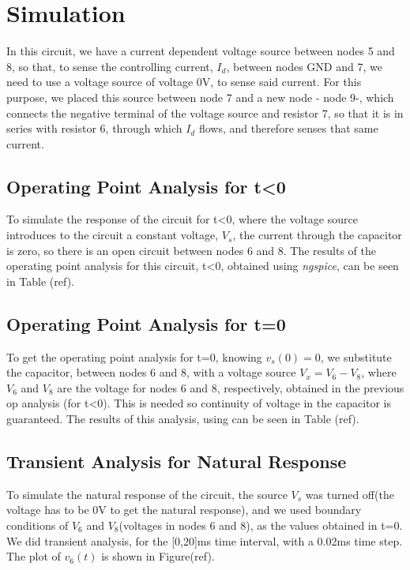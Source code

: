 \section{Simulation}
\label{sec:simulation}
In this circuit, we have a current dependent voltage source between nodes 5 and 8, so that, to sense the controlling current, $I_d$, between nodes GND and 7, we need to use a voltage source of voltage 0V, to sense said current. For this purpose, we placed this source between node 7 and a new node - node 9-, which connects the negative terminal of the voltage source and resistor 7, so that it is in series with resistor 6, through which $I_d$ flows, and therefore senses that same current.\\
\subsection{Operating Point Analysis for t\textless0}
To simulate the response of the circuit for t\textless0, where the voltage source introduces to the circuit a constant voltage, $V_s$, the current through the capacitor is zero, so there is an open circuit between nodes 6 and 8. The results of the operating point analysis for this circuit, t\textless0, obtained using \textit{ngspice}, can be seen in Table (ref).\\

\subsection{Operating Point Analysis for t=0}
To get the operating point analysis for t=0, knowing $v_s(0)=0$, we substitute the capacitor, between nodes 6 and 8, with a voltage source $V_x=V_6-V_8$, where $V_6$ and $V_8$ are the voltage for nodes 6 and 8, respectively, obtained in the previous op analysis (for t\textless0). This is needed so continuity of voltage in the capacitor is guaranteed. The results of this analysis, using  can be seen in Table (ref).\\
\subsection{Transient Analysis for Natural Response}
To simulate the natural response of the circuit, the source $V_s$ was turned off(the voltage has to be 0V to get the natural response), and we used boundary conditions of $V_6$ and $V_8$(voltages in nodes 6 and 8), as the values obtained in t=0. We did transient analysis, for the [0,20]ms time interval, with a 0.02ms time step. The plot of $v_{6}(t)$ is shown in Figure(ref).
